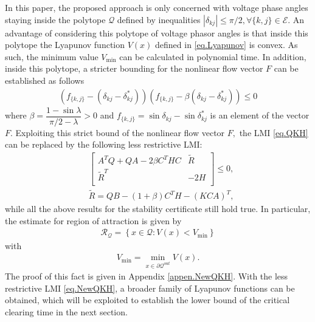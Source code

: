 \documentclass[final]{IEEEtran}
\begin{document}
In this paper, the proposed approach is only concerned with
voltage phase angles staying inside the polytope $\mathcal{Q}$
defined by inequalities $|\delta_{kj}| \le \pi/2, \forall \{k,j\}
\in \mathcal{E}.$ An advantage of considering this polytope of
voltage phasor angles is that inside this polytope the Lyapunov
function $V(x)$ defined in \eqref{eq.Lyapunov} is convex. As such,
the minimum value $V_{\min}$ can be calculated in polynomial time.
In addition, inside this polytope, a stricter bounding for the
nonlinear flow vector $F$ can be established as follows
\begin{align}
\label{eq.NonlinearBounding}
(f_{\{k,j\}}-(\delta_{kj}-\delta_{kj}^*))(f_{\{k,j\}}-\beta(\delta_{kj}-\delta_{kj}^*))
\le 0
\end{align}
where $\beta = \dfrac{1-\sin\lambda}{\pi/2-\lambda}>0$ and
$f_{\{k,j\}}=\sin\delta_{kj}-\sin\delta_{kj}^*$ is an element of
the vector $F.$ Exploiting this strict bound of the nonlinear flow
vector $F,$ the LMI \eqref{eq.QKH} can be replaced by the
following less restrictive LMI:
\begin{align}
\label{eq.NewQKH}
    &\left[   \begin{array}{ccccc}
          A^TQ+QA-2\beta C^THC   & \tilde{R} \\
          \tilde{R}^T  & -2H\\
        \end{array}\right] \le 0, \\
       & \tilde{R}=QB-(1+\beta)C^TH-(KCA)^T, \nonumber
\end{align}
while all the above results for the stability certificate still
hold true. In particular, the estimate for region of attraction is
given by
\begin{align}\label{eq.RoAestimate}
 \mathcal{R_Q} = \left\{x \in\mathcal{Q}: V(x) < V_{\min}\right\}
\end{align}
with
\begin{align}
\label{eq.Vmin2} V_{\min}=\mathop {\min}\limits_{x \in
\partial\mathcal{Q}^{out}} V(x).
\end{align}
The proof of this fact is given in Appendix \ref{appen.NewQKH}.
With the less restrictive LMI \eqref{eq.NewQKH}, a broader family
of Lyapunov functions can be obtained, which will be exploited to
establish the lower bound of the critical clearing time in the
next section.
\end{document}

